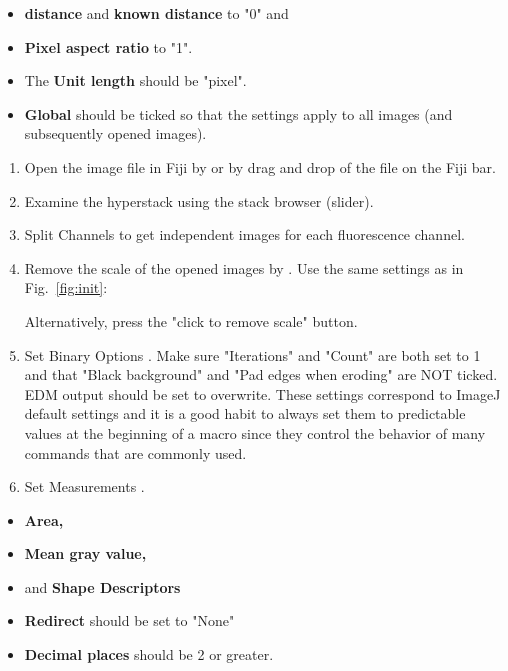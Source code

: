 \begin{itemize}
        \item\textbf{distance} and \textbf{known distance} to "0" and  
        \item\textbf{Pixel aspect ratio} to "1".  
        \item The \textbf{Unit length} should be "pixel". 
        \item  \textbf{Global} should be ticked so that the settings apply to all images (and subsequently opened images). 

    \end{itemize}

\begin{enumerate}
    \item Open the image file in Fiji by
     or by drag and drop of the file on the Fiji bar.
    
    \item Examine the hyperstack using the stack browser (slider).
    
    \item Split Channels to get independent images for each fluorescence channel.
    
    \item Remove the scale of the opened images by 
    . 
    Use the same settings as in Fig.~\ref{fig:init}:
   

    Alternatively, press the "click to remove scale" button. 
    
    \item Set Binary Options 
    .
    Make sure "Iterations" and "Count" are both set to 1 and that "Black background" and "Pad edges when eroding" are NOT ticked. EDM output should be set to overwrite. These settings correspond to ImageJ default settings and it is a good habit to always set them to predictable values at the beginning of a macro since they control the behavior of many commands that are commonly used. 
    
    \item Set Measurements 
    .
    

\end{enumerate}

\begin{itemize}
        \item\textbf{Area,} 
        \item\textbf{Mean gray value,}
        \item and \textbf{Shape Descriptors} 
        
        \item\textbf{Redirect} should be set to "None" 
        \item\textbf{Decimal places} should be 2 or greater.  
    \end{itemize}

